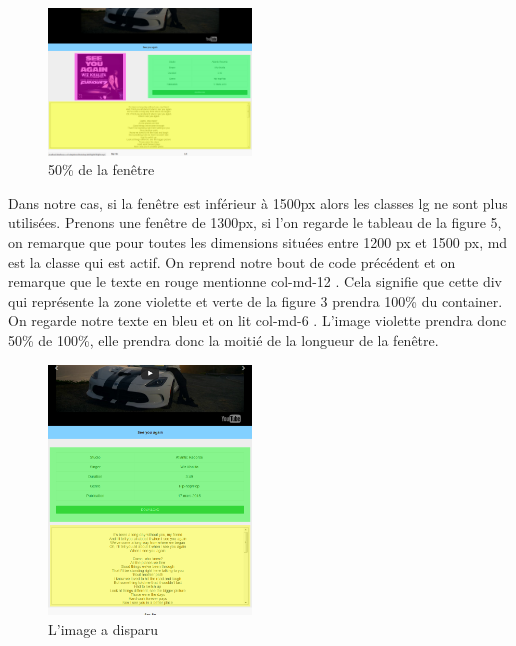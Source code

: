 \documentclass{article}
\begin{document}
\begin{figure}
  \vspace{-20pt}
  \begin{center}
    \includegraphics[width=0.48\textwidth]{p6}
  \end{center}
  \vspace{-20pt}
  \caption{50\% de la fen\^etre}
  \vspace{-10pt}
\end{figure} 

Dans notre cas, si la fen\^etre est inf\'erieur \`a 1500px alors les classes lg ne sont plus utilis\'ees. Prenons une fen\^etre de 1300px, si l'on regarde le tableau de la figure 5, on remarque que pour toutes les dimensions situ\'ees entre 1200 px et 1500 px, md est la classe qui est actif. On reprend notre bout de code pr\'ec\'edent et on remarque que le texte en rouge mentionne \og col-md-12 \fg{}. Cela signifie que cette div qui repr\'esente la zone violette et verte de la figure 3 prendra 100\% du container. On regarde notre texte en bleu et on lit \og col-md-6 \fg{}. L'image violette prendra donc 50\% de 100\%, elle prendra donc la moiti\'e de la longueur de la fen\^etre.\\

\newpage
\begin{figure}
  \vspace{-20pt}
  \begin{center}
    \includegraphics[width=0.48\textwidth]{p7}
  \end{center}
  \vspace{-20pt}
  \caption{L'image a disparu}
  \vspace{-10pt}
\end{figure} 
\end{document}
